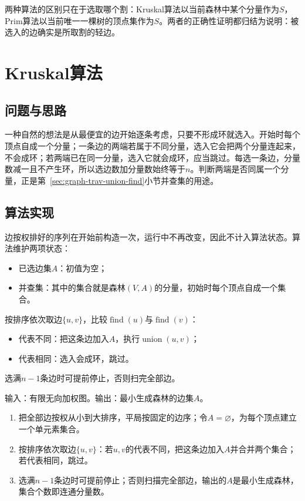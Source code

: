两种算法的区别只在于选取哪个割：Kruskal算法以当前森林中某个分量作为$S$，Prim算法以当前唯一一棵树的顶点集作为$S$。两者的正确性证明都归结为说明：被选入的边确实是所取割的轻边。

\section{Kruskal算法}
\label{sec:graph-opt-kruskal}

\subsection{问题与思路}

一种自然的想法是从最便宜的边开始逐条考虑，只要不形成环就选入。开始时每个顶点自成一个分量；一条边的两端若属于不同分量，选入它会把两个分量连起来，不会成环；若两端已在同一分量，选入它就会成环，应当跳过。每选一条边，分量数减一且不产生环，所以选边数加分量数始终等于$n$。判断两端是否同属一个分量，正是第~\ref{sec:graph-trav-union-find}小节并查集的用途。

\subsection{算法实现}

边按权排好的序列在开始前构造一次，运行中不再改变，因此不计入算法状态。算法维护两项状态：
\begin{itemize}
  \item 已选边集$A$：初值为空；
  \item 并查集：其中的集合就是森林$(V,A)$的分量，初始时每个顶点自成一个集合。
\end{itemize}
按排序依次取边$\{u,v\}$，比较$\operatorname{find}(u)$与$\operatorname{find}(v)$：
\begin{itemize}
  \item 代表不同：把这条边加入$A$，执行$\operatorname{union}(u,v)$；
  \item 代表相同：选入会成环，跳过。
\end{itemize}
选满$n-1$条边时可提前停止，否则扫完全部边。

\begin{algorithm}[Kruskal算法]
\label{alg:graph-opt-kruskal}
输入：有限无向加权图。输出：最小生成森林的边集$A$。
\begin{enumerate}
  \item 把全部边按权从小到大排序，平局按固定的边序；令$A=\varnothing$，为每个顶点建立一个单元素集合。
  \item 按排序依次取边$\{u,v\}$：若$u,v$的代表不同，把这条边加入$A$并合并两个集合；若代表相同，跳过。
  \item 选满$n-1$条边时可提前停止；否则扫描完全部边，输出的$A$是最小生成森林，集合个数即连通分量数。
\end{enumerate}
\end{algorithm}

